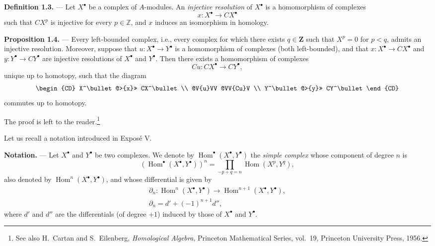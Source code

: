 \documentclass[11pt,a4paper,oneside]{book}
\providecommand{\ZZ}{\mathbf Z}
\theoremstyle{plain}
\theoremstyle{definition}
\theoremstyle{remark}
\begin{document}
\medskip
{}\noindent\textbf{Definition 1.3.} --- Let $X^\bullet$ be a complex of
$A$-modules. An \emph{injective resolution} of $X^\bullet$ is a homomorphism
of complexes
\[
  x\colon X^\bullet\longrightarrow CX^\bullet
\]
such that $CX^p$ is injective for every $p\in\mathbb Z$, and $x$ induces an
isomorphism in homology.


\noindent\textbf{Proposition 1.4.} --- Every left-bounded complex, i.e., every
complex for which there exists $q\in\ZZ$ such that $X^p=0$ for $p<q$, admits
an injective resolution. Moreover, suppose that
$u\colon X^\bullet\longrightarrow Y^\bullet$ is a homomorphism of complexes
(both left-bounded), and that
$x\colon X^\bullet\longrightarrow CX^\bullet$ and
$y\colon Y^\bullet\longrightarrow CY^\bullet$ are injective resolutions of
$X^\bullet$ and $Y^\bullet$. Then there exists a homomorphism of complexes
\[
  Cu\colon CX^\bullet\longrightarrow CY^\bullet,
\]
unique up to homotopy, such that the diagram
\[
\begin{CD}
X^\bullet @>{x}>> CX^\bullet \\
@V{u}VV @VV{Cu}V \\
Y^\bullet @>{y}>> CY^\bullet
\end{CD}
\]
commutes up to homotopy.


The proof is left to the reader.\footnote{See also H.~Cartan and
S.~Eilenberg, \emph{Homological Algebra}, Princeton Mathematical Series,
vol.~19, Princeton University Press, 1956.}

Let us recall a notation introduced in Expos\'e V.

\medskip
\noindent\textbf{Notation.} --- Let $X^\bullet$ and $Y^\bullet$ be two
complexes. We denote by $\operatorname{Hom}^\bullet(X^\bullet,Y^\bullet)$ the
\emph{simple complex} whose component of degree $n$ is
\[
  (\operatorname{Hom}^\bullet(X^\bullet,Y^\bullet))^n
  =\prod_{-p+q=n}\operatorname{Hom}(X^p,Y^q),
\]
also denoted by $\operatorname{Hom}^n(X^\bullet,Y^\bullet)$, and whose
differential is given by
\begin{gather*}
  \partial_n\colon
  \operatorname{Hom}^n(X^\bullet,Y^\bullet)
  \longrightarrow
  \operatorname{Hom}^{n+1}(X^\bullet,Y^\bullet),\\
  \partial_n=d'+(-1)^{n+1}d'',
\end{gather*}
where $d'$ and $d''$ are the differentials (of degree $+1$) induced by those
of $X^\bullet$ and $Y^\bullet$.
\end{document}
